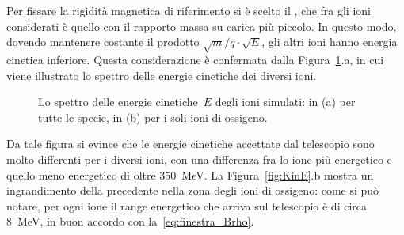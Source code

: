 Per fissare la rigidità magnetica di riferimento si è scelto il , che fra gli ioni considerati è quello con il rapporto massa su carica più piccolo.
In questo modo, dovendo mantenere costante il prodotto $\sqrt{m}/q \cdot \sqrt{E}$, gli altri ioni hanno energia cinetica inferiore.
Questa considerazione è confermata dalla Figura~\ref{fig:KinEa}.a, in cui viene illustrato lo spettro delle energie cinetiche dei diversi ioni.
\begin{figure} [!p]
	\centering
	
	\caption{Lo spettro delle energie cinetiche~$E$ degli ioni simulati: in (a) per tutte le specie, in (b) per i soli ioni di ossigeno.} \label{fig:KinEa}
\end{figure}
Da tale figura si evince che le energie cinetiche accettate dal telescopio sono molto differenti per i diversi ioni, con una differenza fra lo ione più energetico e quello meno energetico di oltre 350~MeV.
La Figura~\ref{fig:KinE}.b mostra un ingrandimento della precedente nella zona degli ioni di ossigeno: come si può notare, per ogni ione il range energetico che arriva sul telescopio è di circa 8~MeV, in buon accordo con la~\ref{eq:finestra_Brho}.


